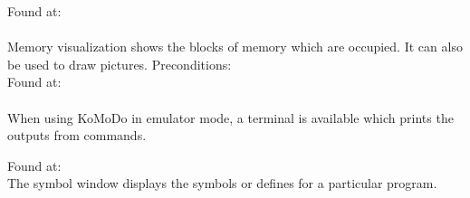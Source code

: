 \graphicspath{ {images/extra/} }

Found at: \\\\
Memory visualization shows the blocks of memory which are occupied. It can also be used to draw pictures.
\pagebreak
{}
Preconditions: \\
Found at: \\\\
When using KoMoDo in emulator mode, a terminal is available which prints the outputs from  commands.
\pagebreak

Found at: \\
The symbol window displays the symbols or defines for a particular program. 
